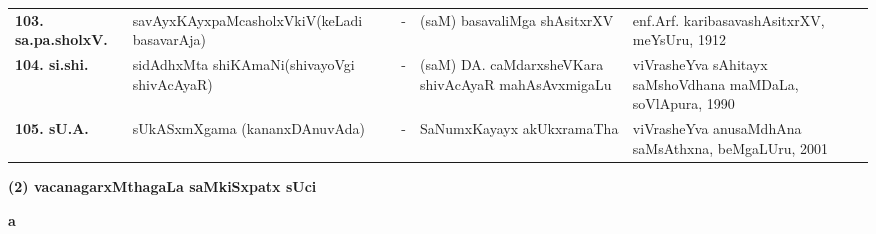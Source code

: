 {\begin{longtable}{lp{5cm}cp{5cm}<{\raggedright}p{3cm}<{\raggedright}@{}}
{\bf 103. sa.pa.sholxV.} & savAyxKAyxpaMcasholxVkiV\newline (keLadi basavarAja) &-& (saM) basavaliMga shAsitxrXV & enf.Arf. karibasavashAsitxrXV, meYsUru, 1912\\
{\bf 104. si.shi.} & sidAdhxMta shiKAmaNi\newline (shivayoVgi shivAcAyaR) &-& (saM) DA. caMdarxsheVKara shivAcAyaR mahAsAvxmigaLu & viVrasheYva sAhitayx saMshoVdhana maMDaLa, soVlApura, 1990\\
{\bf 105. sU.A.} & sUkASxmXgama (kananxDAnuvAda) &-& SaNumxKayayx akUkxramaTha & viVrasheYva anusaMdhAna saMsAthxna, beMgaLUru, 2001\\
\end{longtable}}


\newpage

\begin{center}
{\large\bf (2) vacanagarxMthagaLa saMkiSxpatx sUci}
\end{center}

\medskip

\centerline{\bf a}

\medskip

